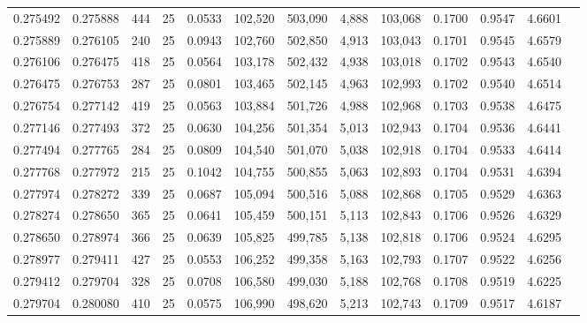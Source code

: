 \begin{tabular}{rrrrrrrrrrrrr}
0.275492 & 0.275888 &   444 &  25 &                                     0.0533 & 102,520 & 503,090 &   4,888 & 103,068 & 0.1700 & 0.9547 & 4.6601 \\
0.275889 & 0.276105 &   240 &  25 &                                     0.0943 & 102,760 & 502,850 &   4,913 & 103,043 & 0.1701 & 0.9545 & 4.6579 \\
0.276106 & 0.276475 &   418 &  25 &                                     0.0564 & 103,178 & 502,432 &   4,938 & 103,018 & 0.1702 & 0.9543 & 4.6540 \\
0.276475 & 0.276753 &   287 &  25 &                                     0.0801 & 103,465 & 502,145 &   4,963 & 102,993 & 0.1702 & 0.9540 & 4.6514 \\
0.276754 & 0.277142 &   419 &  25 &                                     0.0563 & 103,884 & 501,726 &   4,988 & 102,968 & 0.1703 & 0.9538 & 4.6475 \\
0.277146 & 0.277493 &   372 &  25 &                                     0.0630 & 104,256 & 501,354 &   5,013 & 102,943 & 0.1704 & 0.9536 & 4.6441 \\
0.277494 & 0.277765 &   284 &  25 &                                     0.0809 & 104,540 & 501,070 &   5,038 & 102,918 & 0.1704 & 0.9533 & 4.6414 \\
0.277768 & 0.277972 &   215 &  25 &                                     0.1042 & 104,755 & 500,855 &   5,063 & 102,893 & 0.1704 & 0.9531 & 4.6394 \\
0.277974 & 0.278272 &   339 &  25 &                                     0.0687 & 105,094 & 500,516 &   5,088 & 102,868 & 0.1705 & 0.9529 & 4.6363 \\
0.278274 & 0.278650 &   365 &  25 &                                     0.0641 & 105,459 & 500,151 &   5,113 & 102,843 & 0.1706 & 0.9526 & 4.6329 \\
0.278650 & 0.278974 &   366 &  25 &                                     0.0639 & 105,825 & 499,785 &   5,138 & 102,818 & 0.1706 & 0.9524 & 4.6295 \\
0.278977 & 0.279411 &   427 &  25 &                                     0.0553 & 106,252 & 499,358 &   5,163 & 102,793 & 0.1707 & 0.9522 & 4.6256 \\
0.279412 & 0.279704 &   328 &  25 &                                     0.0708 & 106,580 & 499,030 &   5,188 & 102,768 & 0.1708 & 0.9519 & 4.6225 \\
0.279704 & 0.280080 &   410 &  25 &                                     0.0575 & 106,990 & 498,620 &   5,213 & 102,743 & 0.1709 & 0.9517 & 4.6187 \\

\end{tabular}
